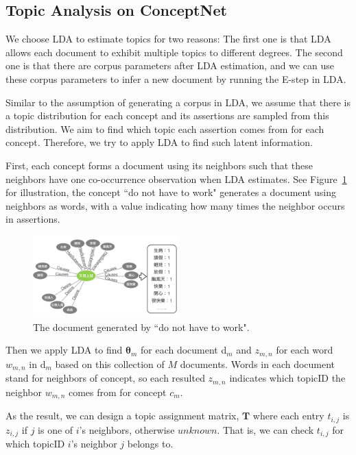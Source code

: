 \subsection{Topic Analysis on ConceptNet}
We choose LDA to estimate topics for two reasons: The first one is that LDA allows each document to exhibit multiple topics to different degrees. The second one is that there are corpus parameters after LDA estimation, and we can use these corpus parameters to infer a new document by running the E-step in LDA. 

Similar to the assumption of generating a corpus in LDA, we assume that there is a topic distribution for each concept and its assertions are sampled from this distribution. We aim to find which topic each assertion comes from for each concept. Therefore, we try to apply LDA to find such latent information. 

First, each concept forms a document using its neighbors such that these neighbors have one co-occurrence observation when LDA estimates. See Figure~\ref{fig:noWorkDoc} for illustration, the concept ``do not have to work" generates a document using neighbors as words, with a value indicating how many times the neighbor occurs in assertions.

\begin{figure}[!t]
\centering
\includegraphics[width=0.5\textwidth]{fig/noWorkDoc.png}
\caption{The document generated by ``do not have to work".}
\label{fig:noWorkDoc}
\end{figure}

Then we apply LDA to find $\boldsymbol{\theta}_m$ for each document d$_m$ and $z_{m,n}$ for each word $w_{m,n}$ in d$_m$ based on this collection of $M$ documents. Words in each document stand for neighbors of concept, so each resulted $z_{m,n}$ indicates which topicID the neighbor $w_{m,n}$ comes from for concept $c_m$.

As the result, we can design a topic assignment matrix, $\boldsymbol{T}$ where each entry $t_{i,j}$ is $z_{i,j}$ if $j$ is one of $i$'s neighbors, otherwise $unknown$. That is, we can check $t_{i,j}$ for which topicID $i$'s neighbor $j$ belongs to. 

